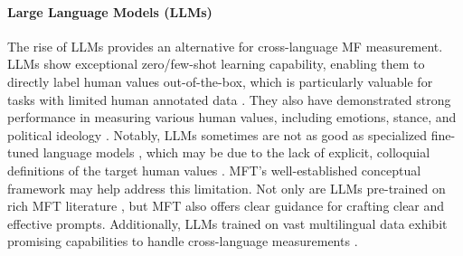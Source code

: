 
\paragraph{Large Language Models (LLMs)}
The rise of LLMs provides an alternative for cross-language MF measurement. LLMs show exceptional zero/few-shot learning capability, enabling them to directly label human values out-of-the-box, which is particularly valuable for tasks with limited human annotated data \citep{ziems2024can}. They also have demonstrated strong performance in measuring various human values, including emotions, stance, and political ideology \citep{ziems2024can,gilardi2023chatgpt, tornberg2023chatgpt}. Notably, LLMs sometimes are not as good as specialized fine-tuned language models \citep{amin2023will,preniqi2024moralbert}, which may be due to the lack of explicit, colloquial definitions of the target human values \citep{ziems2024can}. MFT’s well-established conceptual framework may help address this limitation. Not only are LLMs pre-trained on rich MFT literature \citep[e.g.,][]{abdulhai2023moral}, but MFT also offers clear guidance for crafting clear and effective prompts. Additionally, LLMs trained on vast multilingual data exhibit promising capabilities to handle cross-language measurements \citep{ahuja2023mega}.

